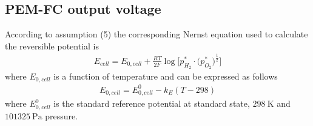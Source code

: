 \documentclass[11pt,a4paper]{article}
\numberwithin{equation}{section}
\theoremstyle{it}
\theoremstyle{definition}
\begin{document}
\subsection{PEM-FC output voltage}\label{PEMFC_output_voltage}
According to assumption (5) the corresponding Nernst equation used to calculate the reversible potential is
\begin{equation}\label{eq20}
	\begin{aligned}
		E_{cell} = E_{0,cell} + \frac{RT}{2F}\log\Bigg[{p_{H_2}^*\cdot\Big(p_{O_2}^*\Big)^{\frac{1}{2}}}\Bigg]
	\end{aligned}
\end{equation}
where $E_{0,cell}$ is a function of temperature and can be expressed as follows
\begin{equation}\label{eq21}
	\begin{aligned}
		E_{0,cell} = E_{0,cell}^0 - k_E(T-298)
	\end{aligned}
\end{equation}
where $E_{0,cell}^0$ is the standard reference potential at standard state, $\SI{298}{\kelvin}$ and $\SI{101325}{\pascal}$ pressure.
\end{document}
